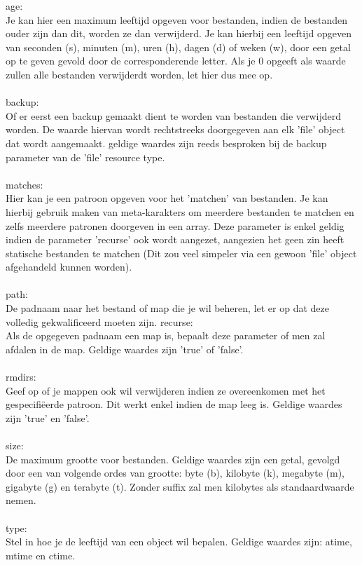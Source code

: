 age:\\
Je kan hier een maximum leeftijd opgeven voor bestanden, indien de bestanden ouder zijn dan dit, worden ze dan verwijderd. Je kan hierbij een leeftijd opgeven van seconden (s), minuten (m), uren (h), dagen (d) of weken (w), door een getal op te geven gevold door de corresponderende letter. Als je 0 opgeeft als waarde zullen alle bestanden verwijderdt worden, let hier dus mee op.\\\\
%
backup:\\
Of er eerst een backup gemaakt dient te worden van bestanden die verwijderd worden. De waarde hiervan wordt rechtstreeks doorgegeven aan elk 'file' object dat wordt aangemaakt. geldige waardes zijn reeds besproken bij de backup parameter van de 'file' resource type.\\\\
%
matches:\\
Hier kan je een patroon opgeven voor het 'matchen' van bestanden. Je kan hierbij gebruik maken van meta-karakters om meerdere bestanden te matchen en zelfs meerdere patronen doorgeven in een array. Deze parameter is enkel geldig indien de parameter 'recurse' ook wordt aangezet, aangezien het geen zin heeft statische bestanden te matchen (Dit zou veel simpeler via een gewoon 'file' object afgehandeld kunnen worden).\\\\
%
path:\\
De padnaam naar het bestand of map die je wil beheren, let er op dat deze volledig gekwalificeerd moeten zijn.
%
recurse:\\
Als de opgegeven padnaam een map is, bepaalt deze parameter of men zal afdalen in de map. Geldige waardes zijn 'true' of 'false'.\\\\
%
rmdirs:\\
Geef op of je mappen ook wil verwijderen indien ze overeenkomen met het gespecifi\"eerde patroon. Dit werkt enkel indien de map leeg is. Geldige waardes zijn 'true' en 'false'.\\\\
%
size:\\
De maximum grootte voor bestanden. Geldige waardes zijn een getal, gevolgd door een van volgende ordes van grootte: byte (b), kilobyte (k), megabyte (m), gigabyte (g) en terabyte (t). Zonder suffix zal men kilobytes als standaardwaarde nemen.\\\\
%
type:\\
Stel in hoe je de leeftijd van een object wil bepalen. Geldige waardes zijn: atime, mtime en ctime.\\\\
